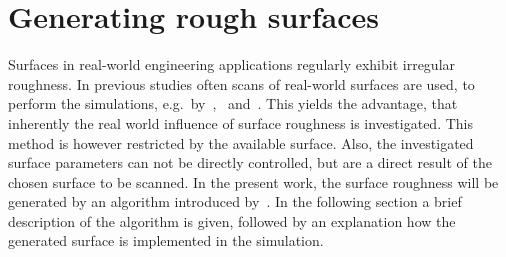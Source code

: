 \section{Generating rough surfaces}\label{sec:generating rough surfaces}
Surfaces in real-world engineering applications regularly exhibit irregular roughness.
In previous studies often scans of real-world surfaces are used, to perform the simulations, e.g.\ by~\cite{thakkarInvestigationTurbulentFlow2017},~\cite{demaioDirectNumericalSimulation2023} and~\cite{busseReynoldsnumberDependenceNearwall2017}.
This yields the advantage, that inherently the real world influence of surface roughness is investigated.
This method is however restricted by the available surface.
Also, the investigated surface parameters can not be directly controlled, but are a direct result of the chosen surface to be scanned.
In the present work, the surface roughness will be generated by an algorithm introduced by~\cite{perez-rafolsGeneratingRandomlyRough2019}.
In the following section a brief description of the algorithm is given, followed by an explanation how the generated surface is implemented in the simulation.

